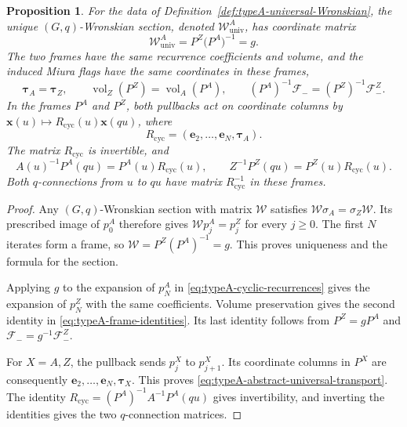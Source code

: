 \documentclass[11pt,leqno]{amsart}
\numberwithin{equation}{section}
\theoremstyle{plain}
\newtheorem{proposition}[theorem]{Proposition}
\theoremstyle{definition}
\theoremstyle{plain}
\theoremstyle{definition}
\theoremstyle{remark}
\begin{document}
\begin{proposition}\label{prop:typeA-cyclic-reconstruction}
For the data of Definition~\ref{def:typeA-universal-Wronskian}, the unique $(G,q)$-Wronskian section, denoted $\mathscr W_{\mathrm{univ}}^A$, has coordinate matrix
\begin{equation}\label{eq:typeA-abstract-universal-formula}
 \mathscr W_{\mathrm{univ}}^A=P^Z\bigl(P^A\bigr)^{-1}=g.
\end{equation}
The two frames have the same recurrence coefficients and volume, and the induced Miura flags have the same coordinates in these frames,
\begin{equation}\label{eq:typeA-frame-identities}
 \boldsymbol\tau_A=\boldsymbol\tau_Z,
 \qquad \operatorname{vol}_Z(P^Z)=\operatorname{vol}_A(P^A),
 \qquad (P^A)^{-1}\mathcal F_-=(P^Z)^{-1}\mathcal F_-^Z.
\end{equation}
In the frames $P^A$ and $P^Z$, both pullbacks act on coordinate columns by $\mathbf x(u)\mapsto R_{\mathrm{cyc}}(u)\mathbf x(qu)$, where
\[
 R_{\mathrm{cyc}}=(\mathbf e_2,\ldots,\mathbf e_N,\boldsymbol\tau_A).
\]
The matrix $R_{\mathrm{cyc}}$ is invertible, and
\begin{equation}\label{eq:typeA-abstract-universal-transport}
 A(u)^{-1}P^A(qu)=P^A(u)R_{\mathrm{cyc}}(u),
 \qquad Z^{-1}P^Z(qu)=P^Z(u)R_{\mathrm{cyc}}(u).
\end{equation}
Both $q$-connections from $u$ to $qu$ have matrix $R_{\mathrm{cyc}}^{-1}$ in these frames.
\end{proposition}
\begin{proof}
Any $(G,q)$-Wronskian section with matrix $\mathscr W$ satisfies $\mathscr W\sigma_A=\sigma_Z\mathscr W$. Its prescribed image of $p_0^A$ therefore gives $\mathscr Wp_j^A=p_j^Z$ for every $j\ge0$. The first $N$ iterates form a frame, so $\mathscr W=P^Z(P^A)^{-1}=g$. This proves uniqueness and the formula for the section.

Applying $g$ to the expansion of $p_N^A$ in \eqref{eq:typeA-cyclic-recurrences} gives the expansion of $p_N^Z$ with the same coefficients. Volume preservation gives the second identity in \eqref{eq:typeA-frame-identities}. Its last identity follows from $P^Z=gP^A$ and $\mathcal F_-=g^{-1}\mathcal F_-^Z$.

For $X=A,Z$, the pullback sends $p_j^X$ to $p_{j+1}^X$. Its coordinate columns in $P^X$ are consequently $\mathbf e_2,\ldots,\mathbf e_N,\boldsymbol\tau_X$. This proves \eqref{eq:typeA-abstract-universal-transport}. The identity $R_{\mathrm{cyc}}=(P^A)^{-1}A^{-1}P^A(qu)$ gives invertibility, and inverting the identities gives the two $q$-connection matrices.
\end{proof}
\end{document}
